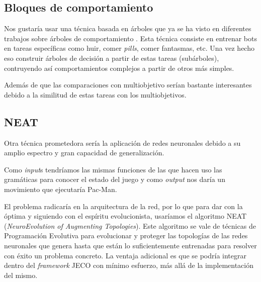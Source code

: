 \subsection{Bloques de comportamiento}
Nos gustaría usar una técnica basada en árboles que ya se ha visto en diferentes trabajos sobre árboles de comportamiento \cite{lim2010evolving} \cite{perez2011evolving}. Esta técnica consiste en entrenar bots en tareas específicas como huir, comer \textit{pills}, comer fantasmas, etc. Una vez hecho eso construir árboles de decisión a partir de estas tareas (subárboles), contruyendo así comportamientos complejos a partir de otros más simples.

Además de que las comparaciones con multiobjetivo serían bastante interesantes debido a la similitud de estas tareas con los multiobjetivos.

\subsection{NEAT}
Otra técnica prometedora sería la aplicación de redes neuronales debido a su amplio espectro y gran capacidad de generalización.

Como \textit{input}s tendríamos las mismas funciones de las que hacen uso las gramáticas para conocer el estado del juego y como \textit{output} nos daría un movimiento que ejecutaría Pac-Man.

El problema radicaría en la arquitectura de la red, por lo que para dar con la óptima y siguiendo con el espíritu evolucionista, usaríamos el algoritmo NEAT \cite{stanley2002evolving} (\textit{NeuroEvolution of Augmenting Topologies}). Este algoritmo se vale de técnicas de Programación Evolutiva para evolucionar y proteger las topologías de las redes neuronales que genera hasta que están lo suficientemente entrenadas para resolver con éxito un problema concreto. La ventaja adicional es que se podría integrar dentro del \textit{framework} JECO con mínimo esfuerzo, más allá de la implementación del mismo.